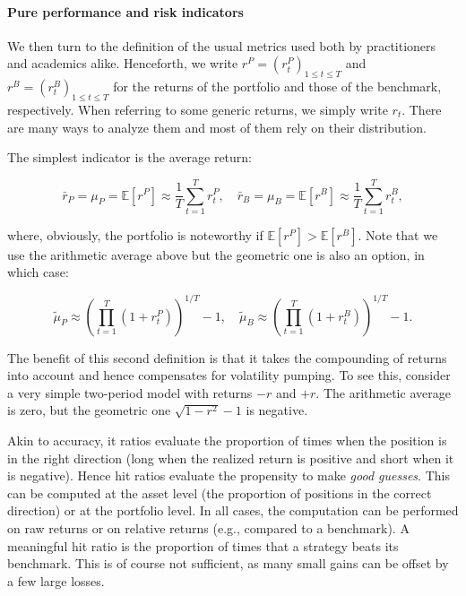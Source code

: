 \paragraph{Pure performance and risk indicators}

We then turn to the definition of the usual metrics used both by practitioners and academics alike. Henceforth, we write $r^P=(r_t^P)_{1\le t\le T}$ and $r^B=(r_t^B)_{1\le t\le T}$ for the returns of the portfolio and those of the benchmark, respectively. When referring to some generic returns, we simply write $r_t$. There are many ways to analyze them and most of them rely on their distribution.

The simplest indicator is the average return:

\begin{equation}
\bar{r}_P=\mu_P=\mathbb{E}[r^P]\approx \frac{1}{T}\sum_{t=1}^T r_t^P, \quad \bar{r}_B=\mu_B=\mathbb{E}[r^B]\approx \frac{1}{T}\sum_{t=1}^T r_t^B,
\end{equation}

where, obviously, the portfolio is noteworthy if $\mathbb{E}[r^P]>\mathbb{E}[r^B]$. Note that we use the arithmetic average above but the geometric one is also an option, in which case:

\begin{equation}
\tilde{\mu}_P\approx \left(\prod_{t=1}^T(1+r^P_t) \right)^{1/T}-1 , \quad \tilde{\mu}_B \approx  \left(\prod_{t=1}^T(1+r^B_t) \right)^{1/T}-1.
\end{equation}

The benefit of this second definition is that it takes the compounding of returns into account and hence compensates for volatility pumping. To see this, consider a very simple two-period model with returns $-r$ and $+r$. The arithmetic average is zero, but the geometric one $\sqrt{1 -r^2} -1$ is negative.

Akin to accuracy, it ratios evaluate the proportion of times when the position is in the right direction (long when the realized return is positive and short when it is negative). Hence hit ratios evaluate the propensity to make \textit{good guesses}. This can be computed at the asset level (the proportion of positions in the correct direction) or at the portfolio level. In all cases, the computation can be performed on raw returns or on relative returns (e.g., compared to a benchmark). A meaningful hit ratio is the proportion of times that a strategy beats its benchmark. This is of course not sufficient, as many small gains can be offset by a few large losses.

